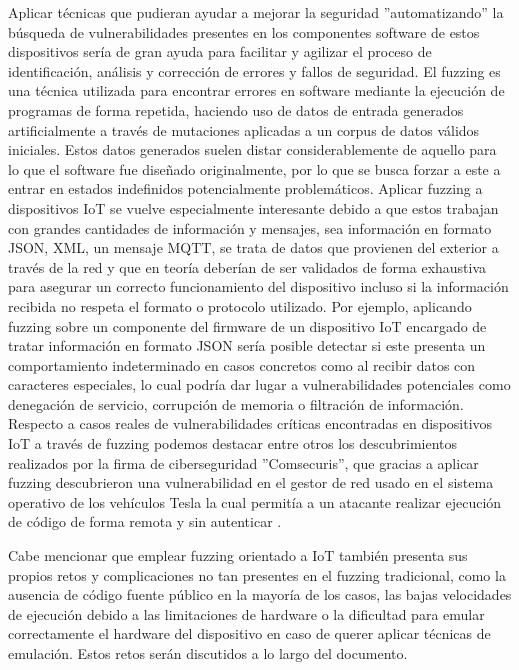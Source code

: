 Aplicar técnicas que pudieran ayudar a mejorar la seguridad ''automatizando'' la búsqueda de vulnerabilidades presentes en los componentes software 
de estos dispositivos sería de gran ayuda para facilitar y agilizar el proceso de identificación, análisis y corrección 
de errores y fallos de seguridad. El fuzzing es una técnica utilizada para encontrar errores en software mediante la ejecución de 
programas de forma repetida, haciendo uso de datos de entrada generados artificialmente a través de mutaciones aplicadas a un
corpus de datos válidos iniciales. Estos datos generados suelen distar considerablemente de aquello para lo que el software fue diseñado 
originalmente, por lo que se busca forzar a este a entrar en estados indefinidos potencialmente problemáticos. Aplicar
fuzzing a dispositivos IoT se vuelve especialmente interesante debido a que estos trabajan con grandes cantidades de información y mensajes,
sea información en formato JSON, XML, un mensaje MQTT, se trata de datos que provienen del exterior a través de la red y que en teoría deberían de ser validados 
de forma exhaustiva para asegurar un correcto funcionamiento del dispositivo incluso si la información recibida no respeta el formato o protocolo 
utilizado. Por ejemplo, aplicando fuzzing sobre un componente del firmware de un dispositivo IoT encargado de tratar información en formato JSON
sería posible detectar si este presenta un comportamiento indeterminado en casos concretos como al recibir datos con caracteres especiales, lo cual
podría dar lugar a vulnerabilidades potenciales como denegación de servicio, corrupción de memoria o filtración de información. Respecto a casos reales
de vulnerabilidades críticas encontradas en dispositivos IoT a través de fuzzing podemos destacar entre otros los descubrimientos realizados por la firma 
de ciberseguridad ''Comsecuris'', que gracias a aplicar fuzzing descubrieron una vulnerabilidad en el gestor de red usado en el 
sistema operativo de los vehículos Tesla la cual permitía a un atacante realizar ejecución de código de forma remota y sin autenticar \cite{TeslaMCU}.\bigskip

Cabe mencionar que emplear fuzzing orientado a IoT también presenta sus propios retos y complicaciones no tan presentes en el fuzzing tradicional, como la ausencia de código fuente público en la mayoría de los casos, las bajas velocidades de ejecución debido a las limitaciones de hardware o la dificultad para emular correctamente el hardware del dispositivo en caso de querer aplicar técnicas de emulación. Estos retos serán discutidos a lo largo del documento.\bigskip

